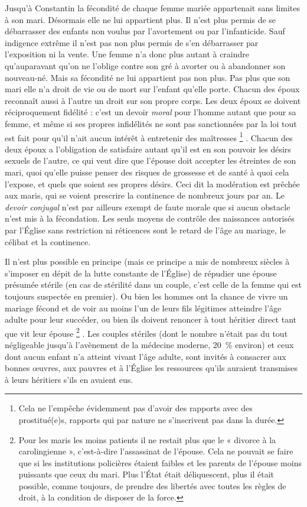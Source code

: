  Jusqu'à Constantin la fécondité de chaque femme mariée appartenait sans limites à son mari. Désormais elle ne lui appartient plus. Il n'est plus permis de se débarrasser des enfants non voulus par l'avortement ou par l'infanticide. Sauf indigence extrême il n'est pas non plus permis de s'en débarrasser par l'exposition ni la vente. Une femme n'a donc plus autant à craindre qu'auparavant qu'on ne l'oblige contre son gré à avorter ou à abandonner son nouveau-né. Mais sa fécondité ne lui appartient pas non plus. Pas plus que son mari elle n'a droit de vie ou de mort sur l'enfant qu'elle porte. Chacun des époux reconnaît aussi à l'autre un droit sur son propre corps. Les deux époux se doivent réciproquement fidélité : c'est un devoir \emph{moral} pour l'homme autant que pour sa femme, et même si ses propres infidélités ne sont pas sanctionnées par la loi tout est fait pour qu'il n'ait aucun intérêt à entretenir des maîtresses%
\footnote{Cela ne l'empêche évidemment pas d'avoir des rapports avec des prostitué(e)s, rapports qui par nature ne s'inscrivent pas dans la durée.}%
. Chacun des deux époux a l'obligation de satisfaire autant qu'il est en son pouvoir les désirs sexuels de l'autre, ce qui veut dire que l'épouse doit accepter les étreintes de son mari, quoi qu'elle puisse penser des risques de grossesse et de santé à quoi cela l'expose, et quels que soient ses propres désirs. Ceci dit la modération est prêchée aux maris, qui se voient prescrire la continence de nombreux jours par an. Le \emph{devoir conjugal} n'est par ailleurs exempt de faute morale que si aucun obstacle n'est mis à la fécondation. Les seuls moyens de contrôle des naissances autorisés par l'Église sans restriction ni réticences sont le retard de l'âge au mariage, le célibat et la continence. 

 Il n'est plus possible en principe (mais ce principe a mis de nombreux siècles à s'imposer en dépit de la lutte constante de l'Église) de répudier une épouse présumée stérile (en cas de stérilité dans un couple, c'est celle de la femme qui est toujours suspectée en premier). Ou bien les hommes ont la chance de vivre un mariage fécond et de voir au moins l'un de leurs fils légitimes atteindre l'âge adulte pour leur succéder, ou bien ils doivent renoncer à tout héritier direct tant que vit leur épouse%
\footnote{Pour les maris les moins patients il ne restait plus que le « divorce à la carolingienne », c'est-à-dire l'assassinat de l'épouse. Cela ne pouvait se faire que si les institutions policières étaient faibles et les parents de l'épouse moins puissants que ceux du mari. Plus l'État était déliquescent, plus il était possible, comme toujours, de prendre des libertés avec toutes les règles de droit, à la condition de disposer de la force.}%
. Les couples stériles (dont le nombre n'était pas du tout négligeable jusqu'à l'avènement de la médecine moderne, 20~\% environ) et ceux dont aucun enfant n'a atteint vivant l'âge adulte, sont invités à consacrer aux bonnes œuvres, aux pauvres et à l'Église les ressources qu'ils auraient transmises à leurs héritiers s'ils en avaient eus.

